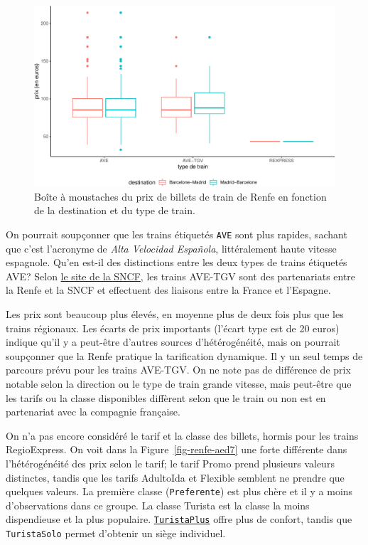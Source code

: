 \documentclass[
  11pt,
  letterpaper,
]{book}
\theoremstyle{definition}
\theoremstyle{remark}
\begin{document}
\begin{figure}[ht!]

{\centering \includegraphics[width=1\textwidth,height=\textheight]{./01-analyseexploratoire_files/figure-pdf/fig-renfe-aed4-1.pdf}

}

\caption{\label{fig-renfe-aed4}Boîte à moustaches du prix de billets de
train de Renfe en fonction de la destination et du type de train.}

\end{figure}

On pourrait soupçonner que les trains étiquetés \texttt{AVE} sont plus
rapides, sachant que c'est l'acronyme de \emph{Alta Velocidad Española},
littéralement haute vitesse espagnole. Qu'en est-il des distinctions
entre les deux types de trains étiquetés AVE? Selon
\href{https://www.renfe-sncf.com/rw-en/services/a-unique-experience/Pages/services.aspx}{le
site de la SNCF}, les trains AVE-TGV sont des partenariats entre la
Renfe et la SNCF et effectuent des liaisons entre la France et
l'Espagne.

Les prix sont beaucoup plus élevés, en moyenne plus de deux fois plus
que les trains régionaux. Les écarts de prix importants (l'écart type
est de 20 euros) indique qu'il y a peut-être d'autres sources
d'hétérogénéité, mais on pourrait soupçonner que la Renfe pratique la
tarification dynamique. Il y un seul temps de parcours prévu pour les
trains AVE-TGV. On ne note pas de différence de prix notable selon la
direction ou le type de train grande vitesse, mais peut-être que les
tarifs ou la classe disponibles diffèrent selon que le train ou non est
en partenariat avec la compagnie française.

On n'a pas encore considéré le tarif et la classe des billets, hormis
pour les trains RegioExpress. On voit dans la
Figure~\ref{fig-renfe-aed7} une forte différente dans l'hétérogénéité
des prix selon le tarif; le tarif Promo prend plusieurs valeurs
distinctes, tandis que les tarifs AdultoIda et Flexible semblent ne
prendre que quelques valeurs. La première classe (\texttt{Preferente})
est plus chère et il y a moins d'observations dans ce groupe. La classe
Turista est la classe la moins dispendieuse et la plus populaire.
\href{http://web.archive.org/web/20161111134241/http://www.renfe.com/viajeros/tarifas/billete_promo.html}{\texttt{TuristaPlus}}
offre plus de confort, tandis que \texttt{TuristaSolo} permet d'obtenir
un siège individuel.
\end{document}
